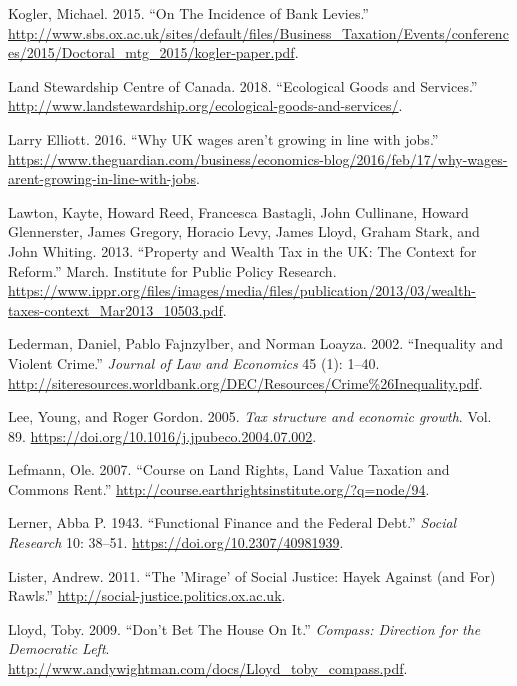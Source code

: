 \documentclass[]{tufte-handout}
\begin{document}
\leavevmode\hypertarget{ref-Kogler2015}{}%
Kogler, Michael. 2015. ``On The Incidence of Bank Levies.''
\url{http://www.sbs.ox.ac.uk/sites/default/files/Business_Taxation/Events/conferences/2015/Doctoral_mtg_2015/kogler-paper.pdf}.

\leavevmode\hypertarget{ref-LandStewardshipCentreofCanada2018}{}%
Land Stewardship Centre of Canada. 2018. ``Ecological Goods and
Services.''
\url{http://www.landstewardship.org/ecological-goods-and-services/}.

\leavevmode\hypertarget{ref-LarryElliott2016}{}%
Larry Elliott. 2016. ``Why UK wages aren't growing in line with jobs.''
\url{https://www.theguardian.com/business/economics-blog/2016/feb/17/why-wages-arent-growing-in-line-with-jobs}.

\leavevmode\hypertarget{ref-Lawton2013a}{}%
Lawton, Kayte, Howard Reed, Francesca Bastagli, John Cullinane, Howard
Glennerster, James Gregory, Horacio Levy, James Lloyd, Graham Stark, and
John Whiting. 2013. ``Property and Wealth Tax in the UK: The Context for
Reform.'' March. Institute for Public Policy Research.
\url{https://www.ippr.org/files/images/media/files/publication/2013/03/wealth-taxes-context_Mar2013_10503.pdf}.

\leavevmode\hypertarget{ref-Lederman2002}{}%
Lederman, Daniel, Pablo Fajnzylber, and Norman Loayza. 2002.
``Inequality and Violent Crime.'' \emph{Journal of Law and Economics} 45
(1): 1--40.
\url{http://siteresources.worldbank.org/DEC/Resources/Crime\%26Inequality.pdf}.

\leavevmode\hypertarget{ref-Lee2005}{}%
Lee, Young, and Roger Gordon. 2005. \emph{Tax structure and economic
growth}. Vol. 89. \url{https://doi.org/10.1016/j.jpubeco.2004.07.002}.

\leavevmode\hypertarget{ref-Lefmann2007}{}%
Lefmann, Ole. 2007. ``Course on Land Rights, Land Value Taxation and
Commons Rent.'' \url{http://course.earthrightsinstitute.org/?q=node/94}.

\leavevmode\hypertarget{ref-Lerner1943}{}%
Lerner, Abba P. 1943. ``Functional Finance and the Federal Debt.''
\emph{Social Research} 10: 38--51.
\url{https://doi.org/10.2307/40981939}.

\leavevmode\hypertarget{ref-Lister2011}{}%
Lister, Andrew. 2011. ``The 'Mirage' of Social Justice: Hayek Against
(and For) Rawls.'' \url{http://social-justice.politics.ox.ac.uk}.

\leavevmode\hypertarget{ref-Lloyd2009}{}%
Lloyd, Toby. 2009. ``Don't Bet The House On It.'' \emph{Compass:
Direction for the Democratic Left}.
\url{http://www.andywightman.com/docs/Lloyd_toby_compass.pdf}.
\end{document}
